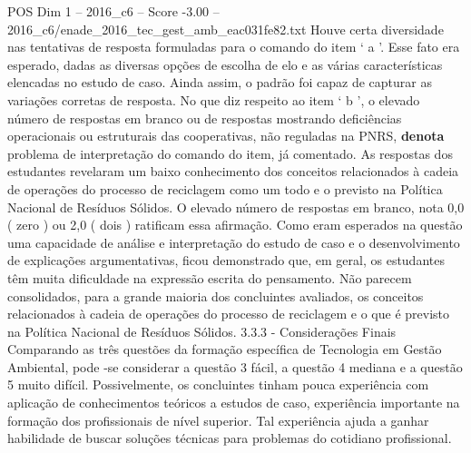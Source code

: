 \begin{textsample}{POS Dim 1 – 2016\_c6 – Score -3.00 – 2016\_c6/enade\_2016\_tec\_gest\_amb\_eac031fe82.txt}
Houve certa diversidade nas tentativas de resposta formuladas para o comando do item ‘ a ’.
Esse fato era esperado, dadas as diversas opções de escolha de elo e as várias características elencadas no estudo de caso.
Ainda assim, o padrão foi capaz de capturar as variações corretas de resposta.
No que diz respeito ao item ‘ b ’, o elevado número de respostas em branco ou de respostas mostrando deficiências operacionais ou estruturais das cooperativas, não reguladas na PNRS, \textbf{denota} problema de interpretação do comando do item, já comentado.
As respostas dos estudantes revelaram um baixo conhecimento dos conceitos relacionados à cadeia de operações do processo de reciclagem como um todo e o previsto na Política Nacional de Resíduos Sólidos.
O elevado número de respostas em branco, nota 0,0 ( zero ) ou 2,0 ( dois ) ratificam essa afirmação.
Como eram esperados na questão uma capacidade de análise e interpretação do estudo de caso e o desenvolvimento de explicações argumentativas, ficou demonstrado que, em geral, os estudantes têm muita dificuldade na expressão escrita do pensamento.
Não parecem consolidados, para a grande maioria dos concluintes avaliados, os conceitos relacionados à cadeia de operações do processo de reciclagem e o que é previsto na Política Nacional de Resíduos Sólidos. 3.3.3 - Considerações Finais Comparando as três questões da formação específica de Tecnologia em Gestão Ambiental, pode -se considerar a questão 3 fácil, a questão 4 mediana e a questão 5 muito difícil.
Possivelmente, os concluintes tinham pouca experiência com aplicação de conhecimentos teóricos a estudos de caso, experiência importante na formação dos profissionais de nível superior.
Tal experiência ajuda a ganhar habilidade de buscar soluções técnicas para problemas do cotidiano profissional.

\end{textsample}

